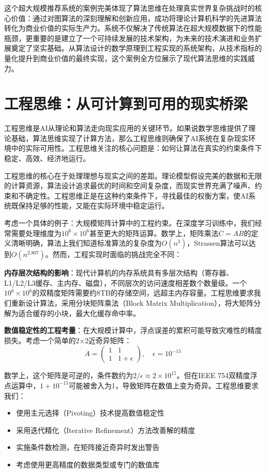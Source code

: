 这个超大规模推荐系统的案例完美体现了算法思维在处理真实世界复杂挑战时的核心价值：通过对图算法的深刻理解和创新应用，成功将理论计算机科学的先进算法转化为商业价值的实际生产力。系统不仅解决了传统算法在超大规模数据下的性能瓶颈，更重要的是建立了一个可持续发展的技术架构，为未来的技术演进和业务扩展奠定了坚实基础。从算法设计的数学原理到工程实现的系统架构，从技术指标的量化提升到商业价值的最终实现，这个案例全方位展示了现代算法思维的实践威力。

\section{工程思维：从可计算到可用的现实桥梁}

工程思维是AI从理论和算法走向现实应用的关键环节。如果说数学思维提供了理论基础，算法思维实现了计算方法，那么工程思维则确保了AI系统在复杂现实环境中的实际可用性。工程思维关注的核心问题是：如何让算法在真实的约束条件下稳定、高效、经济地运行。

工程思维的核心在于处理理想与现实之间的差距。理论模型假设完美的数据和无限的计算资源，算法设计追求最优的时间和空间复杂度，而现实世界充满了噪声、约束和不确定性。工程思维正是在这种约束条件下，寻找最佳的权衡方案，使AI系统既保持足够的性能，又能在实际环境中稳定运行。

考虑一个具体的例子：大规模矩阵计算中的工程约束。在深度学习训练中，我们经常需要处理维度为$10^6 \times 10^6$甚至更大的矩阵运算。数学上，矩阵乘法$C = AB$的定义清晰明确，算法上我们知道标准算法的复杂度为$O(n^3)$，Strassen算法可以达到$O(n^{2.807})$。然而，工程实现时面临的挑战完全不同：

\textbf{内存层次结构的影响}：现代计算机的内存系统具有多层次结构（寄存器、L1/L2/L3缓存、主内存、磁盘），不同层次的访问速度相差数个数量级。一个$10^6 \times 10^6$的双精度矩阵需要约8TB的存储空间，远超主内存容量。工程思维要求我们重新设计算法，采用分块矩阵乘法（Block Matrix Multiplication），将大矩阵分解为适合缓存的小块，最大化缓存命中率。

\textbf{数值稳定性的工程考量}：在大规模计算中，浮点误差的累积可能导致灾难性的精度损失。考虑一个简单的2×2近奇异矩阵：
$$A = \begin{pmatrix} 1 & 1 \\ 1 & 1+\epsilon \end{pmatrix}, \quad \epsilon = 10^{-15}$$

数学上，这个矩阵是可逆的，条件数约为$2/\epsilon \approx 2 \times 10^{15}$。但在IEEE 754双精度浮点运算中，$1 + 10^{-15}$可能被舍入为1，导致矩阵在数值上变为奇异。工程思维要求我们：
\begin{itemize}
\item 使用主元选择（Pivoting）技术提高数值稳定性
\item 采用迭代精化（Iterative Refinement）方法改善解的精度
\item 实施条件数检测，在矩阵接近奇异时发出警告
\item 考虑使用更高精度的数据类型或专门的数值库
\end{itemize}

